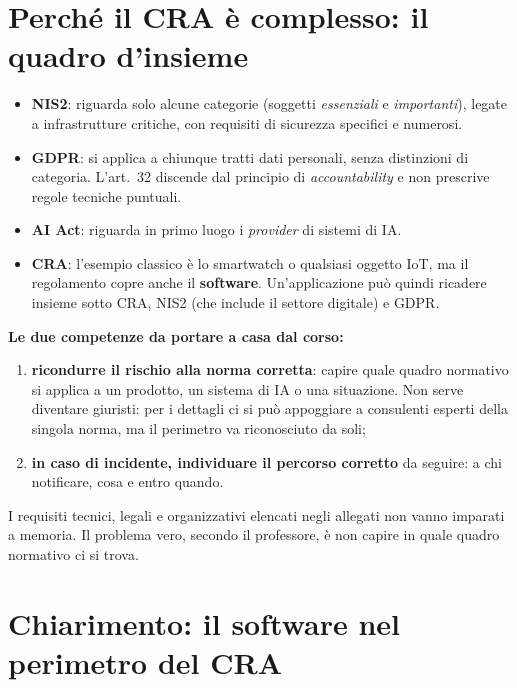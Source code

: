 \section{Perché il CRA è complesso: il quadro d'insieme}

\begin{itemize}
  \item \textbf{NIS2}: riguarda solo alcune categorie (soggetti \emph{essenziali} e \emph{importanti}),
    legate a infrastrutture critiche, con requisiti di sicurezza specifici e numerosi.
  \item \textbf{GDPR}: si applica a chiunque tratti dati personali, senza distinzioni di categoria.
    L'art.~32 discende dal principio di \emph{accountability} e non prescrive regole tecniche puntuali.
  \item \textbf{AI Act}: riguarda in primo luogo i \emph{provider} di sistemi di IA.
  \item \textbf{CRA}: l'esempio classico è lo smartwatch o qualsiasi oggetto IoT, ma il regolamento
    copre anche il \textbf{software}. Un'applicazione può quindi ricadere insieme sotto CRA, NIS2
    (che include il settore digitale) e GDPR.
\end{itemize}

\begin{esame}
\textbf{Le due competenze da portare a casa dal corso:}
\begin{enumerate}
  \item \textbf{ricondurre il rischio alla norma corretta}: capire quale quadro normativo si applica
    a un prodotto, un sistema di IA o una situazione. Non serve diventare giuristi: per i dettagli
    ci si può appoggiare a consulenti esperti della singola norma, ma il perimetro va riconosciuto da soli;
  \item \textbf{in caso di incidente, individuare il percorso corretto} da seguire: a chi notificare,
    cosa e entro quando.
\end{enumerate}
I requisiti tecnici, legali e organizzativi elencati negli allegati non vanno imparati a memoria.
Il problema vero, secondo il professore, è non capire in quale quadro normativo ci si trova.
\end{esame}

\section{Chiarimento: il software nel perimetro del CRA}

